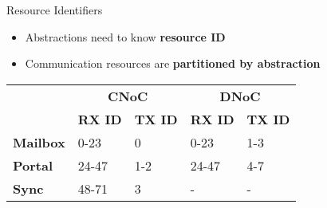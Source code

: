 		\begin{frame}[fragile]{Resource Identifiers}
			\begin{itemize}
				\item Abstractions need to know \textbf{resource ID}
				\item Communication resources are \textbf{partitioned by abstraction}
			\end{itemize}

			\begin{table}[!tb]
				\centering%
				\begin{tabular}{l|l|l|l|l|}
					\cline{2-5}
														   & \multicolumn{2}{c|}{\textbf{CNoC}}               & \multicolumn{2}{c|}{\textbf{DNoC}}           \\ \cline{2-5}
														   & \textbf{RX ID} & \textbf{TX ID} & \textbf{RX ID} & \textbf{TX ID} \\ \hline
					\multicolumn{1}{|l|}{\textbf{Mailbox}} & 0-23           & 0              & 0-23           & 1-3            \\ \hline
					\multicolumn{1}{|l|}{\textbf{Portal}}  & 24-47          & 1-2            & 24-47          & 4-7            \\ \hline
					\multicolumn{1}{|l|}{\textbf{Sync}}    & 48-71          & 3              & -              & -              \\ \hline
				\end{tabular}
			\end{table}

			
		\end{frame}

